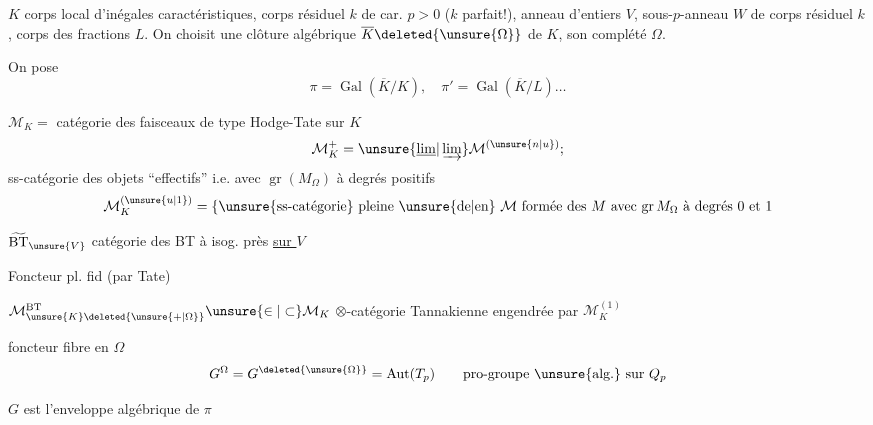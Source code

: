  $K$ corps local d'inégales caractéristiques, corps résiduel $k$ de car. $p>0$ ($k$ parfait!), anneau d'entiers $V$, sous-$p$-anneau $W$ de corps résiduel $k$, corps des fractions $L$. On choisit une clôture algébrique $\overline K\deleted{\unsure{\Omega}}$ de $K$, son complété $\Omega$.

On pose
\[
\pi=\operatorname{Gal}(\overline K/K),\quad\pi'=\operatorname{Gal}(\overline K/L)\ldots
\]

$\mathcal M_K=$ catégorie des faisceaux de type Hodge-Tate sur $K$
\[
\mathcal M_K^+=\unsure{\underline{\lim}|\varinjlim}\mathcal M^{(\unsure{n|u})};
\]
ss-catégorie des objets ``effectifs'' i.e. avec  $\operatorname{gr}(M_\Omega)$ à degrés positifs
\[
\mathcal M_K^{(\unsure{u|1})}=\{\text{\unsure{ss-catégorie} pleine \unsure{de|en} $\mathcal M$ formée des $M$ avec $\operatorname{gr}M_\Omega$ à degrés 0 et 1}
\]

$\widetilde{\mathrm{BT}}_{\unsure{V}}$ catégorie des BT à isog. près \uline{sur $V$}

Foncteur pl. fid (par Tate)

$\mathcal M_{\unsure{K}\deleted{\unsure{+|\Omega}}}^{\mathrm{BT}}\unsure{\in|\subset}\mathcal M_K$ $\otimes$-catégorie Tannakienne engendrée par $\mathcal M_K^{(1)}$

foncteur fibre en $\Omega$
\[
G^\Omega=G^{\deleted{\unsure{\Omega}}}=\operatorname{Aut}(T_p)\qquad\text{pro-groupe \unsure{alg.} sur }Q_p
\]

$G$ est l'enveloppe algébrique de $\pi$

